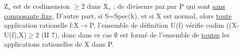 
Z$_s$ est de codimension $\geq 2$ dans X$_s$ ; 
  de diviseurs par.par P qui sont
\uline{sans composante fixe},  D'autre part, si
S=Spec(k), et si X est normal, alors  \uline{toute} application rationelle
f:X$\to$P, l'ensemble de définition U(f) vérifie codim ((X-U(f),X)$\geq$2
(II 7), donc dans ce cas $\emptyset$ est formé de l'ensemble de \uline{toutes} les
applications rationelles de X dans P.

